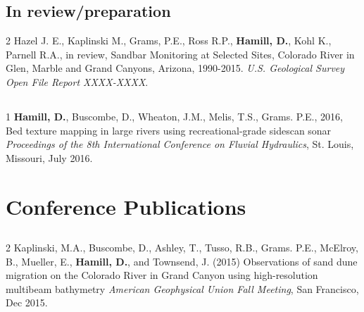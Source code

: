 \documentclass[margin,line]{resume}
\begin{document}
\begin{resume}
\begin{footnotesize}
	\subsection{\mysidestyle In review/preparation}
	\begin{list1}
		
	\item[2] Hazel J. E., Kaplinski M., Grams, P.E., Ross R.P., {\bf Hamill, D.}, Kohl K., Parnell R.A., in review, Sandbar Monitoring at Selected Sites, Colorado River in Glen, Marble and Grand Canyons, Arizona, 1990-2015. {\sl U.S. Geological Survey Open File Report XXXX-XXXX}.\\
	
	\end{list1}
	
	\subsection{}
	\begin{list1}
		
     \item[1] {\bf Hamill, D.}, Buscombe, D., Wheaton, J.M., Melis, T.S., Grams. P.E., 2016, Bed texture mapping in large rivers using recreational-grade sidescan sonar {\sl Proceedings of the 8th International Conference on Fluvial Hydraulics}, St. Louis, Missouri, July 2016.\\

	\end{list1}

    \end{footnotesize}
    
    \section{\mysidestyle Conference Publications}

    \begin{footnotesize}
        
	\subsection{}
	\begin{list1}	
        
        \item[2] Kaplinski, M.A., Buscombe, D., Ashley, T., Tusso, R.B., Grams. P.E., McElroy, B., Mueller, E., {\bf Hamill, D.}, and Townsend, J. (2015) Observations of sand dune migration on the Colorado River in Grand Canyon using high-resolution multibeam bathymetry {\sl American Geophysical Union Fall Meeting}, San Francisco, Dec 2015.\\
        

\end{list1}
\end{footnotesize}
\end{resume}
\end{document}
